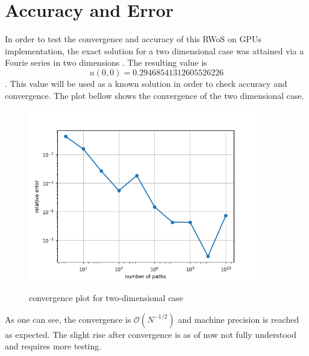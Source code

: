 
\section{Accuracy and Error}
In order to test the convergence and accuracy of this \Gls{RWoS} on \Glspl{GPU} implementation,
the exact solution for a two dimensional case was attained via a Fourie series in
two dimensions \cite{Bornemann}.  The resulting value is  $$u(0,0) = 0.29468 54131 26055 26226$$.
This value will be used as a known solution in order to check accuracy and convergence.
The plot bellow shows the convergence of the two dimensional case.

\begin{figure}
\begin{center}
\includegraphics[width=10.0cm]{styles/convergence} \label{plot:convergence}
  \caption{convergence plot for two-dimensional case}
\end{center}
\end{figure}

As one can see, the convergence is $\mathcal{O}(N^{-1/2})$ and machine precision is reached
as expected.  The slight rise after convergence is as of now not fully understood and
requires more testing.


